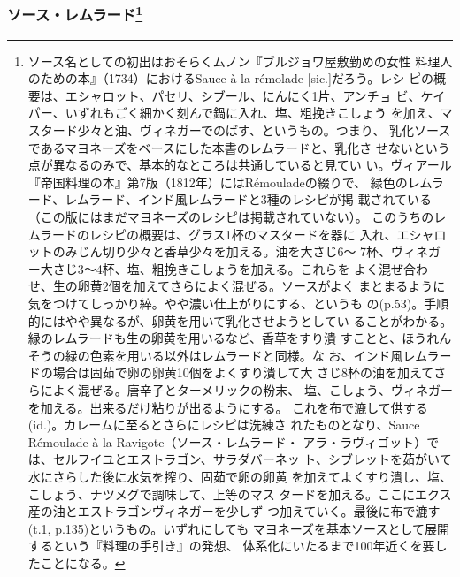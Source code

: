 \begin{recette}
{\subsubsection[ソース・レムラード]{\texorpdfstring{ソース・レムラード\footnote{ソース名としての初出はおそらくムノン『ブルジョワ屋敷勤めの女性
  料理人のための本』（1734）におけるSauce à la rémolade
  {[}sic.{]}だろう。レシ
  ピの概要は、エシャロット、パセリ、シブール、にんにく1片、アンチョ
  ビ、ケイパー、いずれもごく細かく刻んで鍋に入れ、塩、粗挽きこしょう
  を加え、マスタード少々と油、ヴィネガーでのばす、というもの。つまり、
  乳化ソースであるマヨネーズをベースにした本書のレムラードと、乳化さ
  せないという点が異なるのみで、基本的なところは共通していると見てい
  い。ヴィアール『帝国料理の本』第7版（1812年）にはRémouladeの綴りで、
  緑色のレムラード、レムラード、インド風レムラードと3種のレシピが掲
  載されている（この版にはまだマヨネーズのレシピは掲載されていない）。
  このうちのレムラードのレシピの概要は、グラス1杯のマスタードを器に
  入れ、エシャロットのみじん切り少々と香草少々を加える。油を大さじ6〜
  7杯、ヴィネガー大さじ3〜4杯、塩、粗挽きこしょうを加える。これらを
  よく混ぜ合わせ、生の卵黄2個を加えてさらによく混ぜる。ソースがよく
  まとまるように気をつけてしっかり綷。やや濃い仕上がりにする、というも
  の(p.53)。手順的にはやや異なるが、卵黄を用いて乳化させようとしてい
  ることがわかる。緑のレムラードも生の卵黄を用いるなど、香草をすり潰
  すことと、ほうれんそうの緑の色素を用いる以外はレムラードと同様。な
  お、インド風レムラードの場合は固茹で卵の卵黄10個をよくすり潰して大
  さじ8杯の油を加えてさらによく混ぜる。唐辛子とターメリックの粉末、
  塩、こしょう、ヴィネガーを加える。出来るだけ粘りが出るようにする。
  これを布で漉して供する(id.)。カレームに至るとさらにレシピは洗練さ
  れたものとなり、Sauce Rémoulade à la Ravigote（ソース・レムラード・
  アラ・ラヴィゴット）では、セルフイユとエストラゴン、サラダバーネッ
  ト、シブレットを茹がいて水にさらした後に水気を搾り、固茹で卵の卵黄
  を加えてよくすり潰し、塩、こしょう、ナツメグで調味して、上等のマス
  タードを加える。ここにエクス産の油とエストラゴンヴィネガーを少しず
  つ加えていく。最後に布で漉す(t.1, p.135)というもの。いずれにしても
  マヨネーズを基本ソースとして展開するという『料理の手引き』の発想、
  体系化にいたるまで100年近くを要したことになる。}}{ソース・レムラード}}\label{sauce-remoulade}}




\end{recette}
